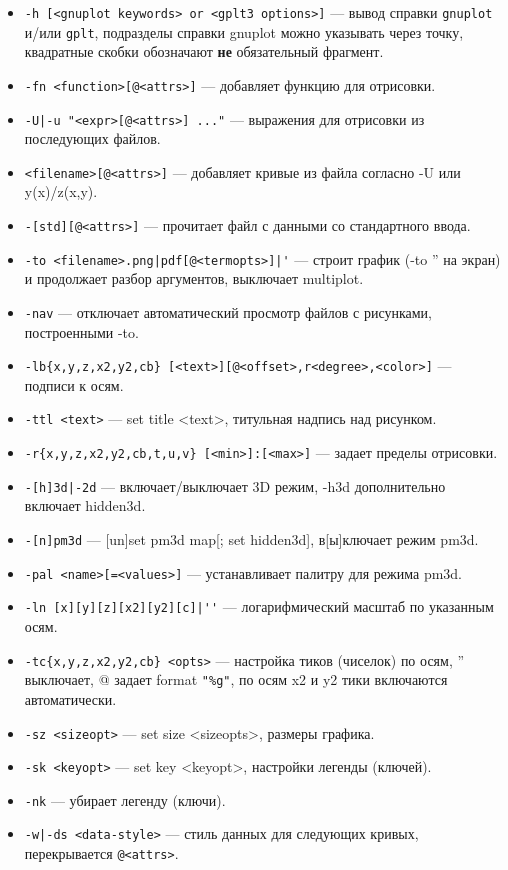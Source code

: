 \documentclass[12pt]{article}
\def\gplt{{\tt gplt}}
\def\gnuplot{{\tt gnuplot}}
\begin{document}
\begin{itemize}
\item \verb'-h [<gnuplot keywords> or <gplt3 options>]' --- вывод справки \gnuplot{} и/или \gplt, 
  подразделы справки gnuplot можно указывать через точку, квадратные скобки обозначают {\bf не} обязательный фрагмент.
\item \verb'-fn <function>[@<attrs>]' --- добавляет функцию для отрисовки.
\item \verb'-U|-u "<expr>[@<attrs>] ..."' --- выражения для отрисовки из последующих файлов.
\item \verb'<filename>[@<attrs>]' --- добавляет кривые из файла согласно -U или y(x)/z(x,y).
\item \verb'-[std][@<attrs>]' --- прочитает файл с данными со стандартного ввода.
\item \verb:-to <filename>.png|pdf[@<termopts>]|': --- строит график (-to '' на экран)
    и продолжает разбор аргументов, выключает multiplot. 
\item \verb'-nav' --- отключает автоматический просмотр файлов с рисунками, построенными -to.                     
\item \verb'-lb{x,y,z,x2,y2,cb} [<text>][@<offset>,r<degree>,<color>]' --- подписи к осям.
\item \verb'-ttl <text>' --- set title <text>, титульная надпись над рисунком.
\item \verb'-r{x,y,z,x2,y2,cb,t,u,v} [<min>]:[<max>]' --- задает пределы отрисовки.
\item \verb'-[h]3d|-2d' --- включает/выключает 3D режим, -h3d дополнительно включает hidden3d.
\item \verb'-[n]pm3d' --- [un]set pm3d map[; set hidden3d], в[ы]ключает режим pm3d.
\item \verb'-pal <name>[=<values>]' --- устанавливает палитру для режима pm3d.
\item \verb:-ln [x][y][z][x2][y2][c]|'': --- логарифмический масштаб по указанным осям.
\item \verb'-tc{x,y,z,x2,y2,cb} <opts>'  --- настройка тиков (чиселок) по осям, '' выключает,
             @ задает format \verb'"%g"', по осям x2 и y2 тики включаются автоматически. 
\item \verb'-sz <sizeopt>' ---  set size <sizeopts>, размеры графика. 
\item \verb'-sk <keyopt>' --- set key <keyopt>, настройки легенды (ключей).
\item \verb'-nk' --- убирает легенду (ключи). 
\item \verb'-w|-ds <data-style>'  --- стиль данных для следующих кривых, перекрывается \verb'@<attrs>'.

\end{itemize}
\end{document}

